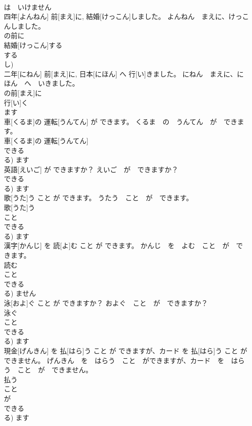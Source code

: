 \documentclass[8pt]{extreport}
\begin{document}
\begin{CJK}{UTF8}{min}
\\	は　いけません 
\\	四年[よんねん] 前[まえ]に, 結婚[けっこん]しました。	よんねん　まえに、けっこんしました。	
\\	の前に 
\\	結婚[けっこん]する 
\\	する 
\\	し)				
\\	二年[にねん] 前[まえ]に, 日本[にほん] へ 行[い]きました。	にねん　まえに、にほん　へ　いきました。	
\\	の前[まえ]に 
\\	行[い]く 
\\	ます 
\\	車[くるま]の 運転[うんてん] が できます。	くるま　の　うんてん　が　できます。	
\\	車[くるま]の 運転[うんてん] 
\\	できる 
\\	る)	ます 
\\	英語[えいご] が できますか？	えいご　が　できますか？	
\\	できる 
\\	る)	ます 
\\	歌[うた]う こと が できます。	うたう　こと　が　できます。	
\\	歌[うた]う 
\\	こと 
\\	できる 
\\	る)	ます 
\\	漢字[かんじ] を 読[よ]む こと が できます。	かんじ　を　よむ　こと　が　できます。	
\\	読む 
\\	こと 
\\	できる 
\\	る)	ません 
\\	泳[およ]ぐ こと が できますか？	およぐ　こと　が　できますか？	
\\	泳ぐ 
\\	こと 
\\	できる 
\\	る)	ます 
\\	現金[げんきん] を 払[はら]う こと が できますが、カード を 払[はら]う こと が できません。	げんきん　を　はらう　こと　ができますが、カード　を　はらう　こと　が　できません。	
\\	払う 
\\	こと 
\\	が 
\\	できる 
\\	る)	ます 

\end{CJK}
\end{document}
